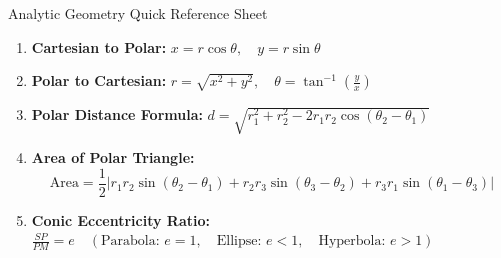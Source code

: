 \documentclass[11pt,a4paper]{article}
\begin{document}
\begin{formulabox}{Analytic Geometry Quick Reference Sheet}
\begin{enumerate}
    \item \textbf{Cartesian to Polar:} $x = r \cos \theta, \quad y = r \sin \theta$
    \item \textbf{Polar to Cartesian:} $r = \sqrt{x^2 + y^2}, \quad \theta = \tan^{-1}\left(\frac{y}{x}\right)$
    \item \textbf{Polar Distance Formula:} $d = \sqrt{r_1^2 + r_2^2 - 2 r_1 r_2 \cos(\theta_2 - \theta_1)}$
    \item \textbf{Area of Polar Triangle:} 
    $$\text{Area} = \frac{1}{2} \Big| r_1 r_2 \sin(\theta_2 - \theta_1) + r_2 r_3 \sin(\theta_3 - \theta_2) + r_3 r_1 \sin(\theta_1 - \theta_3) \Big|$$
    \item \textbf{Conic Eccentricity Ratio:} $\frac{SP}{PM} = e \quad \left(\text{Parabola: } e = 1, \quad \text{Ellipse: } e < 1, \quad \text{Hyperbola: } e > 1\right)$
\end{enumerate}
\end{formulabox}
\end{document}
